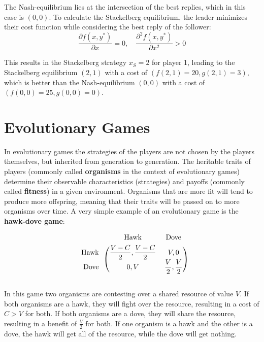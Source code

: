 \documentclass[12pt]{article}
\begin{document}
\noindent
The Nash-equilibrium lies at the intersection of the best replies, which in this case is $(0, 0)$.
To calculate the Stackelberg equilibrium, the leader minimizes their cost function while considering the best reply of the follower:
\[ \frac{\partial f(x, y^*)}{\partial x} = 0, \quad \frac{\partial^2 f(x, y^*)}{\partial x^2} > 0 \]

\noindent
This results in the Stackelberg strategy $x_S = 2$ for player 1, leading to the Stackelberg equilibrium $(2, 1)$ with a cost of $(f(2, 1)=20, g(2, 1)=3)$, which is better than the Nash-equilibrium $(0, 0)$ with a cost of $(f(0, 0)=25, g(0, 0)=0)$.

%
%
\newpage
\section{Evolutionary Games}
In evolutionary games the strategies of the players are not chosen by the players themselves, but inherited from generation to generation.
The heritable traits of players (commonly called \textbf{organisms} in the context of evolutionary games) determine their observable characteristics (strategies) and payoffs (commonly called \textbf{fitness}) in a given environment.
Organisms that are more fit will tend to produce more offspring, meaning that their traits will be passed on to more organisms over time.
A very simple example of an evolutionary game is the \textbf{hawk-dove game}:

\[ \begin{blockarray}{ccc}
    & \text{Hawk} & \text{Dove} \\[1ex]
    \begin{block}{r(cc)}
        \text{Hawk } & \displaystyle \frac{V - C}{2}, \frac{V - C}{2} & V, 0 \\
        \text{Dove } & 0, V & \displaystyle \frac{V}{2}, \frac{V}{2} \\
    \end{block}
\end{blockarray} \]

\noindent
In this game two organisms are contesting over a shared resource of value $V$.
If both organisms are a hawk, they will fight over the resource, resulting in a cost of $C > V$ for both.
If both organisms are a dove, they will share the resource, resulting in a benefit of $\frac{V}{2}$ for both.
If one organism is a hawk and the other is a dove, the hawk will get all of the resource, while the dove will get nothing.
\end{document}
